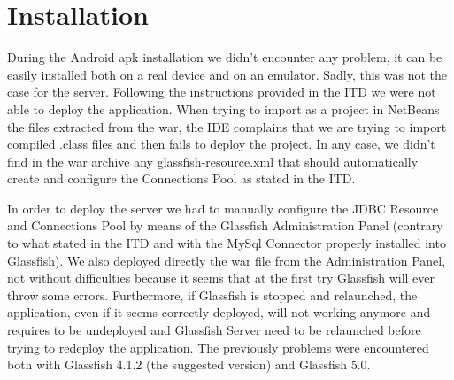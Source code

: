 \section{Installation}
During the Android apk installation we didn't encounter any problem, it can be easily installed both on a real device and on an emulator.
Sadly, this was not the case for the server.
Following the instructions provided in the ITD we were not able to deploy the application.
When trying to import as a project in NetBeans the files extracted from the war, the IDE complains that we are trying to import compiled .class files and then fails to deploy the project.
In any case, we didn't find in the war archive any glassfish-resource.xml that should automatically create and configure the Connections Pool as stated in the ITD.

\vspace{1em}
In order to deploy the server we had to manually configure the JDBC Resource and Connections Pool by means of the Glassfish Administration Panel (contrary to what stated in the ITD and with the MySql Connector properly installed into Glassfish).
We also deployed directly the war file from the Administration Panel, not without difficulties because it seems that at the first try Glassfish will ever throw some errors.
Furthermore, if Glassfish is stopped and relaunched, the application, even if it seems correctly deployed, will not working anymore and requires to be undeployed and Glassfish Server need to be relaunched before trying to redeploy the application.
The previously problems were encountered both with Glassfish 4.1.2 (the suggested version) and Glassfish 5.0.